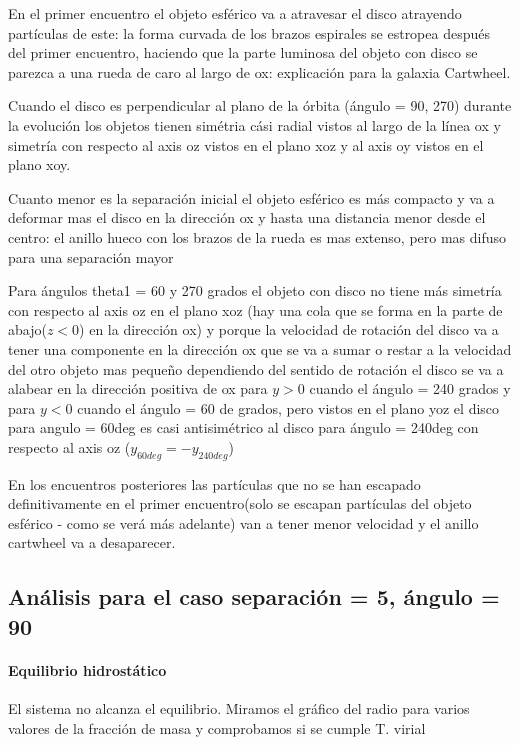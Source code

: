 \documentclass[12pt]{article} %
\renewcommand{\=}[1]{\stackrel{#1}{=}} %
\theoremstyle{definition}
\theoremstyle{remark}
\begin{document}
\clearpage
\newpage

En el primer encuentro el objeto esférico va a atravesar el disco atrayendo partículas de este:
la forma curvada de los brazos espirales se estropea después del primer encuentro, 
haciendo que la parte luminosa del objeto con disco se parezca a una rueda de caro al largo de ox: explicación para la galaxia Cartwheel. 

Cuando el disco es perpendicular al plano de la órbita (ángulo = 90, 270) 
durante la evolución los objetos tienen simétria cási radial vistos al largo de la línea ox y simetría con respecto al axis oz vistos en el plano xoz y al axis oy vistos en el plano xoy.

Cuanto menor es la separación inicial el objeto esférico es más compacto y va a deformar mas el disco en la dirección ox y hasta una distancia menor desde el centro: el anillo hueco con los brazos de la rueda es mas extenso, pero mas difuso para una separación mayor

Para ángulos theta1 = 60 y 270 grados el objeto con disco no tiene más simetría con respecto al axis oz en el plano xoz
(hay una cola que se forma en la parte de abajo($z<0$) en la dirección ox) 
y porque la velocidad de rotación del disco va a tener una componente en la dirección ox que se va a sumar o restar a la 
velocidad del otro objeto mas pequeño dependiendo del sentido de rotación el disco se va a alabear en la dirección 
positiva de ox para $y > 0$ cuando el ángulo = 240 grados  y para $y<0$ cuando el ángulo = 60 de grados,
pero vistos en el plano yoz el disco para angulo = 60deg es casi 
antisimétrico al disco para ángulo = 240deg con respecto al axis oz ($y_{60deg} = -y_{240deg} $)

En los encuentros posteriores las partículas que no se han escapado definitivamente  en el primer encuentro(solo se escapan partículas del objeto esférico - como se verá más adelante) van a tener menor velocidad y el anillo cartwheel va a desaparecer. 


\subsection*{Análisis para el caso separación = 5, ángulo = 90}


\paragraph{Equilibrio hidrostático}
El sistema no alcanza el equilibrio. Miramos el gráfico del radio para varios valores de la fracción de masa y comprobamos si se cumple T. virial
\end{document}
